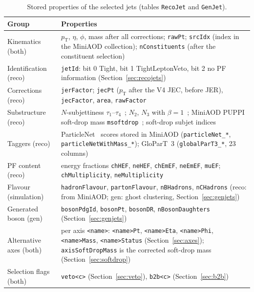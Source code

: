 \documentclass[11pt]{article}
\newcommand{\pt}{p_{\mathrm{T}}}
\newcommand{\code}[1]{\texttt{#1}}
\begin{document}
\begin{table}[htbp]
\centering
\caption{Stored properties of the selected jets (tables \code{RecoJet} and \code{GenJet}).}
\label{tab:jetcols}
\small
\begin{tabularx}{\textwidth}{>{\raggedright\arraybackslash}p{3.3cm}>{\raggedright\arraybackslash}X}
\toprule
Group & Properties \\
\midrule
Kinematics (both) & $\pt$, $\eta$, $\phi$, mass after all corrections; \code{rawPt}; \code{srcIdx} (index in the
  MiniAOD collection); \code{nConstituents} (after the constituent selection) \\
Identification (reco) & \code{jetId}: bit 0 Tight, bit 1 TightLeptonVeto, bit 2 no PF information
  (Section~\ref{sec:recojets}) \\
Corrections (reco) & \code{jerFactor}; \code{jecPt} ($\pt$ after the V4 JEC, before JER), \code{jecFactor},
  \code{area}, \code{rawFactor} \\
Substructure (reco) & $N$-subjettiness $\tau_1$--$\tau_4$~\cite{Thaler:2010tr}; $N_2$, $N_3$ with
  $\beta = 1$~\cite{Moult:2016cvt}; MiniAOD PUPPI soft-drop mass \code{msoftdrop}~\cite{Larkoski:2014wba}; soft-drop
  subjet indices \\
Taggers (reco) & ParticleNet~\cite{Qu:2019gqs} scores stored in MiniAOD (\code{particleNet\_*},
  \code{particleNetWithMass\_*}); GloParT~3 (\code{globalParT3\_*}, 23 columns) \\
PF content (reco) & energy fractions \code{chHEF}, \code{neHEF}, \code{chEmEF}, \code{neEmEF}, \code{muEF};
  \code{chMultiplicity}, \code{neMultiplicity} \\
Flavour (simulation) & \code{hadronFlavour}, \code{partonFlavour}, \code{nBHadrons}, \code{nCHadrons} (reco: from
  MiniAOD; gen: ghost clustering, Section~\ref{sec:genjets}) \\
Generated boson (gen) & \code{bosonPdgId}, \code{bosonPt}, \code{bosonDR}, \code{nBosonDaughters}
  (Section~\ref{sec:genjets}) \\
Alternative axes (both) & per axis \code{<name>}: \code{<name>Pt}, \code{<name>Eta}, \code{<name>Phi},
  \code{<name>Mass}, \code{<name>Status} (Section~\ref{sec:axes}); \code{axisSoftDropMass} is the corrected soft-drop
  mass (Section~\ref{sec:softdrop}) \\
Selection flags (both) & \code{veto<c>} (Section~\ref{sec:veto}), \code{b2b<c>} (Section~\ref{sec:b2b}) \\
\bottomrule
\end{tabularx}
\end{table}
\end{document}
